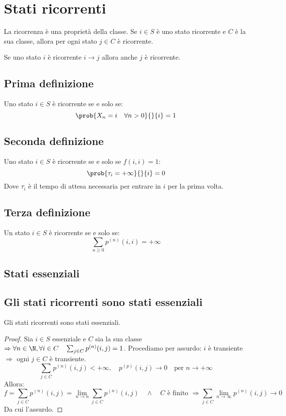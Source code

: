 \documentclass[\main/main.tex]{subfiles}
\begin{document}
\section{Stati ricorrenti}
La ricorrenza è una proprietà della classe. Se \(i \in S\) è uno stato ricorrente e \(C\) è la sua classe, allora per ogni stato \(j \in C\) è ricorrente.

Se uno stato \(i\) è ricorrente \(i \rightarrow j\) allora anche \(j\) è ricorrente.

\subsection{Prima definizione}
\begin{definition}
  Uno stato \(i \in S\) è ricorrente se e solo se:
  \[
    \prob{X_n = i \quad \forall n > 0}{}{i} = 1
  \]
\end{definition}
\subsection{Seconda definizione}
\begin{definition}
  Uno stato \(i \in S\) è ricorrente se e solo se \(f(i,i) = 1\):
  \[
    \prob{\tau_i = +\infty}{}{i} = 0
  \]
  Dove \(\tau_i\) è il tempo di attesa necessaria per entrare in \(i\) per la prima volta.
\end{definition}
\subsection{Terza definizione}
\begin{definition}
  Un stato \(i \in S \) è ricorrente se e solo se:
  \[
    \sum_{n\geq 0} p^{(n)}(i,i) = + \infty
  \]
\end{definition}
\subsection{Stati essenziali}
\subsection{Gli stati ricorrenti sono stati essenziali}
\begin{theorem}[Stati ricorrenti = stati essenziali]
  Gli stati ricorrenti sono stati essenziali.
\end{theorem}
\begin{proof}
  Sia \(i \in S\) essenziale e \(C\) sia la sua classe \(\Rightarrow \forall n \in \N, \forall i \in C \quad \sum_{j \in C} p^{(n)}(i,j) = 1\). Procediamo per assurdo: \(i\) è transiente \(\Rightarrow \) ogni \(j \in C\) è transiente.
  \[
    \sum_{j \in C} p^{(n)}(i,j) < + \infty,\quad p^{(p)}(i,j) \rightarrow 0 \quad \text{per } n \rightarrow + \infty
  \]
  Allora:
  \[
    f = \sum_{j \in C} p^{(n)}(i,j) = \lim_{n \rightarrow n} \sum_{j \in C} p^{(n)}(i,j) \quad \land \quad C \text{ è finito }\Rightarrow \sum_{j \in C} \lim_{n\rightarrow \infty} p^{(n)} (i,j) \rightarrow 0
  \]
  Da cui l'assurdo.
\end{proof}
\end{document}
